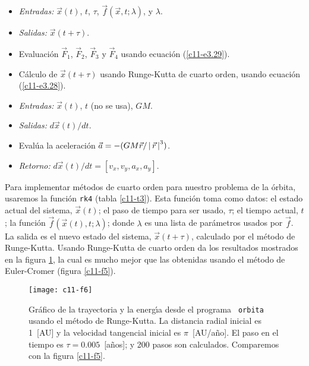 \begin{table}[h!]
\hrulefill
\begin{itemize}
\item {\em Entradas:} $\vec x(t)$, $t$, $\tau$, $\vec f(\vec x, t;\lambda)$,
  y $\lambda$.
\item {\em Salidas:} $\vec x(t+\tau)$.
\item Evaluaci{\'o}n $\vec F_1$, $\vec F_2$, $\vec F_3$ y $\vec F_4$
  usando ecuaci{\'o}n (\ref{c11-e3.29}).  
\item C{\'a}lculo de $\vec x(t+\tau)$ usando Runge-Kutta de cuarto orden,
  usando ecuaci{\'o}n (\ref{c11-e3.28}).
\end{itemize}
\hrulefill
\caption{Bosquejo de la funci{\'o}n {\tt rk4}, la cual eval{\'u}a un paso
  simple usando el m{\'e}todo Runge-Kutta de cuarto orden.}\label{c11-t3}
\end{table}

\begin{table}[h!]
\hrulefill
\begin{itemize}
\item {\em Entradas:} $\vec x(t)$, $t$ (no se usa), $GM$.
\item {\em Salidas:} $d\vec x(t)/dt$.
\item Eval{\'u}a la aceleraci{\'o}n  $\vec a= -(GM \vec r/\left\lvert\, \vec r \,\right\lvert^3)$.
\item {\em Retorno: } $d\vec x(t)/dt= [v_x, v_y, a_x, a_y]$.
\end{itemize}
\hrulefill
\caption{Bosquejo de la funci{\'o}n {\tt gravrk}, la cual es usada por la
  funci{\'o}n Runge-Kutta para evaluar las ecuaciones de movimiento para
  el problema de Kepler.}\label{c11-t4}
\end{table}

Para implementar m{\'e}todos de cuarto orden para nuestro problema de la
{\'o}rbita, usaremos la funci{\'o}n \verb|rk4| (tabla \ref{c11-t3}). Esta
funci{\'o}n toma como datos: el estado actual del sistema, $\vec x(t)$; el
paso de tiempo para ser usado, $\tau$; el tiempo actual, $t$; la funci{\'o}n
$\vec f(\vec x(t),t;\lambda)$; donde $\lambda$ es una lista de par{\'a}metros usados
por $\vec f$. La salida es el nuevo estado del sistema, $\vec x(t+\tau)$,
calculado por el m{\'e}todo de Runge-Kutta.  Usando Runge-Kutta de cuarto
orden da los resultados mostrados en la figura \ref{c11-f6}, la cual
es mucho mejor que las obtenidas usando el m{\'e}todo de Euler-Cromer
(figura \ref{c11-f5}).

\begin{figure}[!h]
\begin{center}
\texttt{[image: c11-f6]}
\caption{Gr{\'a}fico de la trayectoria y la energ{\'\i}a desde el programa {\tt
    orbita} usando el m{\'e}todo de Runge-Kutta.  La distancia radial
  inicial es 1~[AU] y la velocidad tangencial inicial es $\pi$~[AU/a{\~n}o].
  El paso en el tiempo es $\tau=0.005$~[a{\~n}os]; y 200 pasos son calculados.
  Comparemos con la figura \ref{c11-f5}.}\label{c11-f6}
\end{center}
\end{figure}

